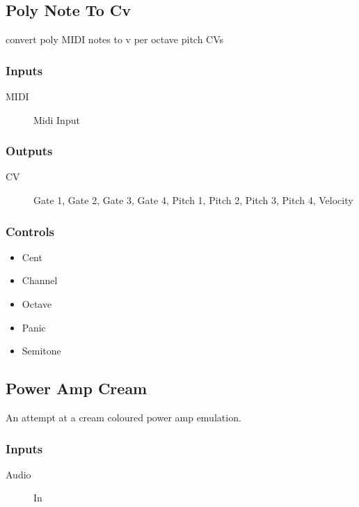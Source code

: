 \subsection{Poly Note To Cv}

convert poly MIDI notes to v per octave pitch CVs



\subsubsection{Inputs}
\begin{description}
\item [MIDI] Midi Input
\end{description}

\subsubsection{Outputs}
\begin{description}
\item [CV] Gate 1, Gate 2, Gate 3, Gate 4, Pitch 1, Pitch 2, Pitch 3, Pitch 4, Velocity
\end{description}

\subsubsection{Controls}
\begin{itemize}
\item Cent
\item Channel
\item Octave
\item Panic
\item Semitone
\end{itemize}

\subsection{Power Amp Cream}

An attempt at a cream coloured power amp emulation.



\subsubsection{Inputs}
\begin{description}
\item [Audio] In
\end{description}

